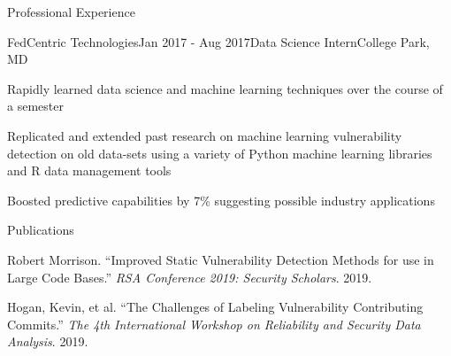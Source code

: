 \documentclass{resume} %
\newenvironment{hanging}{
    \list{}{
        \itemindent=-1em
        \leftmargin=1em
        \topsep=0pt
        \partopsep=0pt
    }
    \item\relax
}{
    \endlist
}
\begin{document}
\begin{rSection}{Professional Experience}

\begin{rSubsection}{FedCentric Technologies}{Jan 2017 - Aug 2017}{Data Science Intern}{College Park, MD}
\item Rapidly learned data science and machine learning techniques over the course of a semester
\item Replicated and extended past research on machine learning vulnerability detection on old data-sets using a variety of Python machine learning libraries and R data management tools
\item Boosted predictive capabilities by 7\% suggesting possible industry applications
\end{rSubsection}


\end{rSection}


\begin{rSection}{Publications}

\begin{hanging}
	Robert Morrison. “Improved Static Vulnerability Detection Methods for use in Large Code Bases.” \textit{RSA Conference 2019: Security Scholars}. 2019.
\end{hanging}
	\vspace{-0.5em} %
\begin{hanging}
	Hogan, Kevin, et al. “The Challenges of Labeling Vulnerability Contributing Commits.” \textit{The 4th International Workshop on Reliability and Security Data Analysis}. 2019.
\end{hanging}

\end{rSection}

\end{document}
